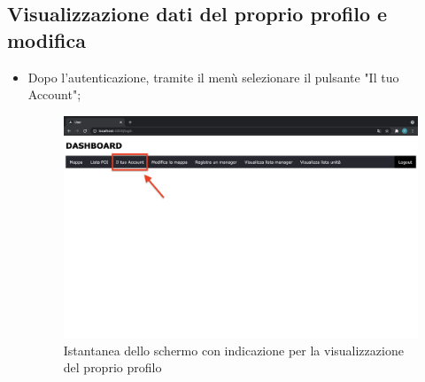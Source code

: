 \subsection{Visualizzazione dati del proprio profilo e modifica}
\begin{itemize}
    \item Dopo l'autenticazione, tramite il menù selezionare il pulsante "Il tuo Account";
    \begin{figure}[H]
        \centering
        \includegraphics[scale=0.12]{res/images/dashboard3.png}
        \caption{Istantanea dello schermo con indicazione per la visualizzazione del proprio profilo}
    \end{figure}
    

\end{itemize}
